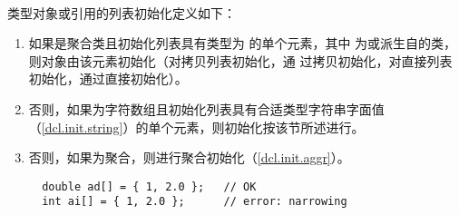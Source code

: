 \paragraph{}
类型对象或引用的列表初始化定义如下：
\begin{enumerate}
  \item{如果是聚合类且初始化列表具有类型为 的单个元素，其中
    为或派生自的类，则对象由该元素初始化（对拷贝列表初始化，通
    过拷贝初始化，对直接列表初始化，通过直接初始化）。}
  \item{否则，如果为字符数组且初始化列表具有合适类型字符串字面值
    （\ref{dcl.init.string}）的单个元素，则初始化按该节所述进行。}
  \item{否则，如果为聚合，则进行聚合初始化（\ref{dcl.init.aggr}）。
\begin{lstlisting}
  double ad[] = { 1, 2.0 };   // OK
  int ai[] = { 1, 2.0 };      // error: narrowing


\end{lstlisting}}
\end{enumerate}
